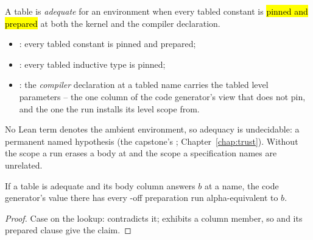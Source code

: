 \begin{definition}\label{def:Witness-SourceTableAdequate}
 \leanok
{}
 A table is \emph{adequate} for an environment when every tabled constant is
\hl{pinned and prepared} at both the kernel and the compiler declaration.
\begin{itemize}
\item {}: every tabled constant is pinned and prepared;
\item {}: every tabled inductive type is pinned;
\item {}: the \emph{compiler} declaration at a tabled name carries the tabled
level parameters -- the one column of the code generator's view that 
does not pin, and the one the run installs its level scope from.
\end{itemize}
 No Lean term denotes the ambient environment, so adequacy is undecidable: a permanent
named hypothesis (the capstone's ; Chapter~\ref{chap:trust}). Without
 the scope a run erases a body at and the scope a specification names are
unrelated.
\end{definition}

\begin{lemma}\label{lem:Witness-SourceTableAdequate-body-prepared}
 \leanok
{}
If a table is adequate and its body column answers $b$ at a name, the code generator's value there
has every -off preparation run alpha-equivalent to $b$.
\end{lemma}

\begin{proof} \leanok
{}
 Case on the lookup:  contradicts it;  exhibits a column member,
so  and its prepared clause give the claim.
\end{proof}


